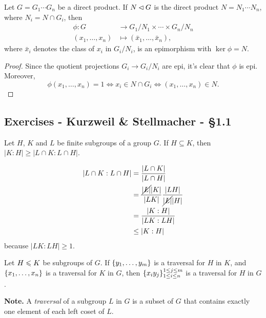 \begin{prop}\label{quotient-of-products}
    Let\/ $G=G_1\cdots G_n$ be a direct product. If\/ $N\lhd G$ is the direct product\/ $N=N_1\cdots N_n$, where\/ $N_i=N\cap G_i$, then
    \begin{align*}
        \phi\colon G&\to G_1/N_1\times\cdots\times G_n/N_n\\
            (x_1,\dots,x_n)&\mapsto (\bar x_1,\dots,\bar x_n),
    \end{align*}
    where\/ $\bar x_i$ denotes the class of\/ $x_i$ in\/ $G_i/N_i$, is an epimorphism with $\ker\phi= N$.
\end{prop}

\begin{proof} Since the quotient projections $G_i\to G_i/N_i$ are epi, it's clear that $\phi$ is epi. Moreover,
$$
    \phi(x_1,\dots,x_n)=1\iff x_i\in N\cap G_i
        \iff (x_1,\dots,x_n)\in N.
$$
 \end{proof}

\subsection{Exercises - Kurzweil \& Stellmacher - \S 1.1}

\begin{exr}
    Let\/ $H$, $K$ and\/ $L$ be finite subgroups of a group\/ $G$. If\/ $H\subseteq K$, then\/ $|K:H|\ge|L\cap K: L\cap H|$.
\end{exr}

\begin{solution}
\begin{align*}
    |L\cap K: L\cap H| &= \frac{|L\cap K|}{|L\cap H|}\\
        &= \frac{\cancel{|L|}|K|}{|LK|}\frac{|LH|}{\cancel{|L|}|H|}\\
        &= \frac{|K:H|}{|LK:LH|}\\
        &\le |K:H|
\end{align*}
because $|LK:LH|\ge1$.
\end{solution}

\begin{exr}\label{exercise-1.1.2}
    Let\/ $H \leqslant K$ be subgroups of\/ $G$. If\/ $\{y_1, \dots, y_m\}$ is a traversal for\/ $H$ in\/ $K$, and\/ $\{x_1, \dots, x_n\}$ is a traversal for\/ $K$ in\/ $G$, then\/ $\{x_iy_j\}_{1\le i\le n}^{1\le j\le m}$ is a traversal for\/ $H$ in\/ $G$.

    \textrm{\rm\textbf{Note.} A \textsl{traversal\/} of a subgroup $L$ in $G$ is a subset of $G$ that contains exactly one element of each left coset of $L$.}
\end{exr}

